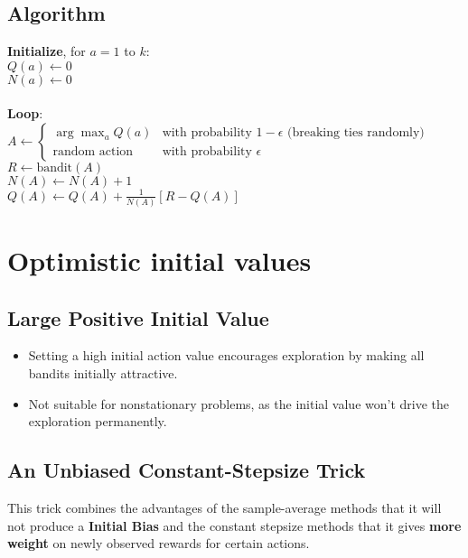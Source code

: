 \documentclass{article}
\begin{document}
\subsection{Algorithm}
\begin{tcolorbox}[colback=white, colframe=black, title=A simple bandit algorithm]
    \textbf{Initialize}, for $a = 1$ to $k$: \\
    \hspace*{0.5cm} $Q(a) \leftarrow 0$ \\
    \hspace*{0.5cm} $N(a) \leftarrow 0$ \\
    \\
    \textbf{Loop}: \\
    \hspace*{0.5cm} $A \leftarrow \begin{cases} 
    \arg\max_{a} Q(a) & \text{with probability } 1 - \epsilon \text{ (breaking ties randomly)} \\
    \text{random action} & \text{with probability } \epsilon 
    \end{cases}$ \\
    \hspace*{0.5cm} $R \leftarrow \text{bandit}(A)$ \\
    \hspace*{0.5cm} $N(A) \leftarrow N(A) + 1$ \\
    \hspace*{0.5cm} $Q(A) \leftarrow Q(A) + \frac{1}{N(A)} \left[R - Q(A)\right]$
    \end{tcolorbox}

\section{Optimistic initial values}
\subsection{Large Positive Initial Value}
\begin{itemize}
    \item Setting a high initial action value encourages exploration by making all bandits initially attractive.
    \item Not suitable for nonstationary problems, as the initial value won't drive the exploration permanently.
\end{itemize}
\subsection{An Unbiased Constant-Stepsize Trick}
This trick combines the advantages of the sample-average methods that it will not produce a \textbf{Initial Bias} and 
the constant stepsize methods that it gives \textbf{more weight} on newly observed rewards for certain actions. 
\end{document}
